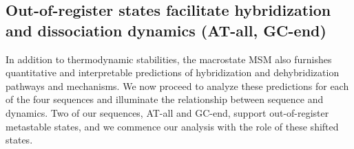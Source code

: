 \documentclass[journal=jpcbfk,manuscript=article]{achemso}
\begin{document}



\subsection{Out-of-register states facilitate hybridization and dissociation dynamics (AT-all, GC-end)}

In addition to thermodynamic stabilities, the macrostate MSM also furnishes quantitative and interpretable predictions of hybridization and dehybridization pathways and mechanisms. We now proceed to analyze these predictions for each of the four sequences and illuminate the relationship between sequence and dynamics. Two of our sequences, AT-all and GC-end, support out-of-register metastable states, and we commence our analysis with the role of these shifted states.
\end{document}
